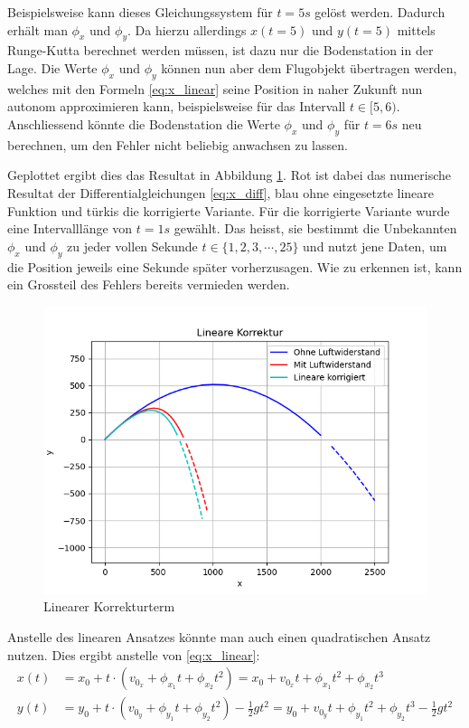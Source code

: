 Beispielsweise kann dieses Gleichungssystem für $t = 5s$ gelöst werden. Dadurch erhält man $\phi_x$ und $\phi_y$. Da hierzu allerdings $x(t=5)$ und $y(t=5)$ mittels Runge-Kutta berechnet werden müssen, ist dazu nur die Bodenstation in der Lage. 
Die Werte $\phi_x$ und $\phi_y$ können nun aber dem Flugobjekt übertragen werden, welches mit den Formeln \eqref{eq:x_linear} seine Position in naher Zukunft nun autonom approximieren kann, beispielsweise für das Intervall $t \in [5,6)$. Anschliessend könnte die Bodenstation die Werte $\phi_x$ und $\phi_y$ für $t=6s$ neu berechnen, um den Fehler nicht beliebig anwachsen zu lassen.

Geplottet ergibt dies das Resultat in Abbildung \ref{naive_linear_term}. Rot ist dabei das numerische Resultat der Differentialgleichungen \eqref{eq:x_diff}, blau ohne eingesetzte lineare Funktion und türkis die korrigierte Variante. Für die korrigierte Variante wurde eine Intervalllänge von $t=1s$ gewählt. Das heisst, sie bestimmt die Unbekannten $\phi_x$ und $\phi_y$ zu jeder vollen Sekunde $t \in \{1, 2, 3, \cdots, 25\}$ und nutzt jene Daten, um die Position jeweils eine Sekunde später vorherzusagen. 
Wie zu erkennen ist, kann ein Grossteil des Fehlers bereits vermieden werden.
\begin{figure}
    \centering
    \includegraphics[scale=0.7]{papers/perturbation/bilder/img1.png}
    \caption{Linearer Korrekturterm}
	\label{naive_linear_term}
\end{figure}


Anstelle des linearen Ansatzes könnte man auch einen quadratischen Ansatz nutzen. Dies ergibt anstelle von \eqref{eq:x_linear}:
\begin{equation}
\begin{aligned}
x(t) &= x_0 + t \cdot (v_{0_x} + \phi_{x_1}t + \phi_{x_2}t^2) = x_0 + v_{0_x}t + \phi_{x_1}t^2 + \phi_{x_2}t^3\\
y(t) &= y_0 + t \cdot (v_{0_y} + \phi_{y_1}t + \phi_{y_2}t^2) - \frac{1}{2}gt^2 = y_0 + v_{0_y}t + \phi_{y_1}t^2 + \phi_{y_2}t^3 - \frac{1}{2}gt^2
\end{aligned}
\end{equation}


